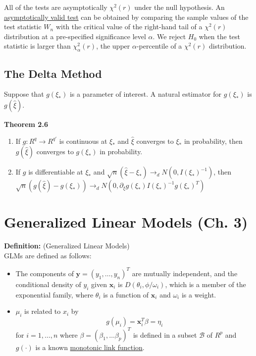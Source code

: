 \documentclass[12pt]{article}
\numberwithin{equation}{section}
\begin{document}
All of the tests are asymptotically $\chi^2(r)$ under the null hypothesis. An \underline{asymptotically valid test} can be obtained by comparing the sample values of the test statistic $W_n$ with the critical value of the right-hand tail of a $\chi^2(r)$ distribution at a pre-specified significance level $\alpha$. We reject $H_0$ when the test statistic is larger than $\chi^2_\alpha(r)$, the upper $\alpha$-percentile of a $\chi^2(r)$ distribution.


\subsection{The Delta Method}
Suppose that $g(\xi_*)$ is a parameter of interest. A natural estimator for $g(\xi_*)$ is $g(\hat{\xi})$. 

\textbf{Theorem 2.6} \\
\begin{enumerate}
  \item If $g : R^q \to R^{q'}$ is continuous at $\xi_*$ and $\hat{\xi}$ converges to $\xi_*$ in probability, then $g(\hat{\xi})$ converges to $g(\xi_*)$ in probability.
  \item If $g$ is differentiable at $\xi_*$ and $\sqrt{n}(\hat{\xi} - \xi_*) \to_d N(0, I(\xi_*)^{-1})$, then 
  $\sqrt{n}(g(\hat{\xi}) - g(\xi_*)) \to_d N(0, \partial_{\xi} g(\xi_*) I(\xi_*)^{-1} g(\xi_*)^T)$
\end{enumerate}


\section{Generalized Linear Models (Ch. 3)}

\textbf{Definition:} (Generalized Linear Models) \\
GLMs are defined as follows:
\begin{itemize}
  \item The components of $\mathbf{y} = (y_1, \ldots, y_n)^T$ are mutually independent, and the conditional density of $y_i$ given $\mathbf{x}_i$ is $D(\theta_i, \phi / \omega_i)$, which is a member of the exponential family, where $\theta_i$ is a function of $\mathbf{x}_i$ and $\omega_i$ is a weight.
  \item $\mu_i$ is related to $x_i$ by
  \begin{equation*}
    g(\mu_i) = \mathbf{x}_i^T \beta = \eta_i
  \end{equation*}
  for $i = 1, \ldots, n$ where $\beta = (\beta_1, \ldots \beta_p)^T$ is defined in a subset $\mathcal{B}$ of $R^p$ and $g(\cdot)$ is a known \underline{monotonic link function}.
\end{itemize}
\end{document}
